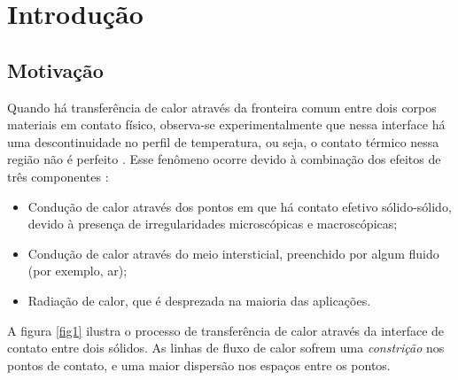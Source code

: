 \section{Introdução}

\subsection{Motivação}

Quando há transferência de calor através da fronteira comum entre dois corpos materiais em contato físico, observa-se experimentalmente que nessa interface há
uma descontinuidade no perfil de temperatura, ou seja, o contato térmico nessa região não é perfeito \citep{livro_ozisik}. 
Esse fenômeno ocorre devido à combinação dos efeitos de três componentes \citep{livro_madhusudana}:
\begin{itemize}
  \item Condução de calor através dos pontos em que há contato efetivo sólido-sólido, devido à presença de irregularidades microscópicas e macroscópicas;
  \item Condução de calor através do meio intersticial, preenchido por algum fluido (por exemplo, ar);
  \item Radiação de calor, que é desprezada na maioria das aplicações. 
\end{itemize} 


% 

A figura \ref{fig1} ilustra o processo de transferência de calor através da interface de contato entre dois sólidos. As linhas de fluxo de calor
sofrem uma \textit{constrição} nos pontos de contato, e uma maior dispersão nos espaços entre os pontos.

